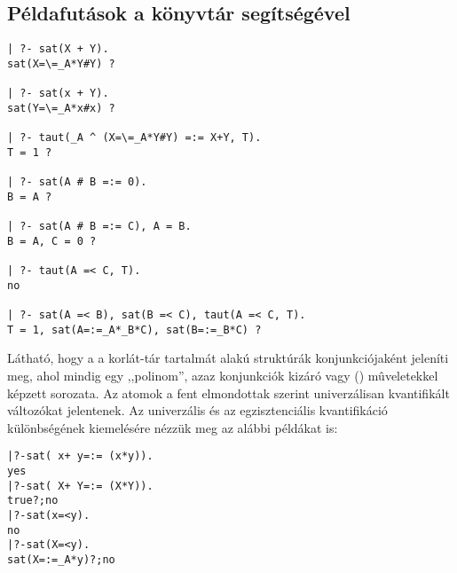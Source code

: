 
\subsection{Példafutások a \clpb könyvtár segítségével}

\begin{verbatim}
| ?- sat(X + Y).
sat(X=\=_A*Y#Y) ? 

| ?- sat(x + Y).
sat(Y=\=_A*x#x) ? 

| ?- taut(_A ^ (X=\=_A*Y#Y) =:= X+Y, T).
T = 1 ? 

| ?- sat(A # B =:= 0).
B = A ? 

| ?- sat(A # B =:= C), A = B.
B = A, C = 0 ? 

| ?- taut(A =< C, T).
no

| ?- sat(A =< B), sat(B =< C), taut(A =< C, T).
T = 1, sat(A=:=_A*_B*C), sat(B=:=_B*C) ? 
\end{verbatim}

Látható, hogy a \clpb a korlát-tár tartalmát  alakú
struktúrák konjunkciójaként jeleníti meg, ahol  mindig egy
,,polinom'', azaz konjunkciók kizáró vagy (\cd{\#}) mûveletekkel képzett
sorozata. Az atomok a fent elmondottak szerint univerzálisan kvantifikált
változókat jelentenek. Az univerzális és az egzisztenciális kvantifikáció
különbségének kiemelésére nézzük meg az alábbi példákat is:

\begin{alltt}
| ?- sat(~x+ ~y=:= ~(x*y)).   % \(\forall\cd{xy}(\lnot\cd{x}\lor\lnot\cd{y}=\lnot(\cd{x}\land\cd{y}))\)
yes
| ?- sat(~X+ ~Y=:= ~(X*Y)).   % \(\exists?\cd{XY}(\lnot\cd{X}\lor\lnot\cd{Y}=\lnot(\cd{X}\land\cd{Y}))\)
true ? ; no
| ?- sat(x=<y).               % \(\forall\cd{xy}(\cd{x} \to \cd{y})\)
no
| ?- sat(X=<y).               % \(\forall\cd{y}\exists?\cd{X}(\cd{X} \to \cd{y})\) 
sat(X=:=_A*y) ? ; no
\end{alltt}

